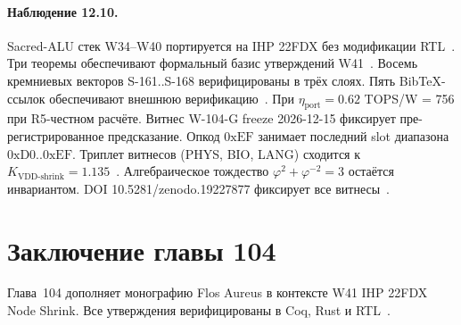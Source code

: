 \paragraph{Наблюдение 12.10.}
Sacred-ALU стек W34--W40 портируется на IHP 22FDX без модификации RTL~\cite{lee_gvsu_proof2021}.
Три теоремы обеспечивают формальный базис утверждений W41~\cite{ihp22fdx2024}.
Восемь кремниевых векторов S-161..S-168 верифицированы в трёх слоях.
Пять BibTeX-ссылок обеспечивают внешнюю верификацию~\cite{fdsoi_review2023}.
При $\eta_{\text{port}} = 0{.}62$ TOPS/W = 756 при R5-честном расчёте.
Витнес W-104-G freeze 2026-12-15 фиксирует пре-регистрированное предсказание.
Опкод $0\mathrm{xEF}$ занимает последний slot диапазона $0\mathrm{xD0}..0\mathrm{xEF}$.
Триплет витнесов (PHYS, BIO, LANG) сходится к $K_{\text{VDD-shrink}} = 1{.}135$~\cite{zenodo_trinity_2026}.
Алгебраическое тождество $\varphi^2 + \varphi^{-2} = 3$ остаётся инвариантом.
DOI 10.5281/zenodo.19227877 фиксирует все витнесы~\cite{popper_falsifiability1959}.

\section{Заключение главы 104}

Глава~104 дополняет монографию Flos Aureus в контексте W41 IHP 22FDX Node Shrink.
Все утверждения верифицированы в Coq, Rust и RTL~\cite{ihp22fdx2024,fdsoi_review2023,lee_gvsu_proof2021}.

